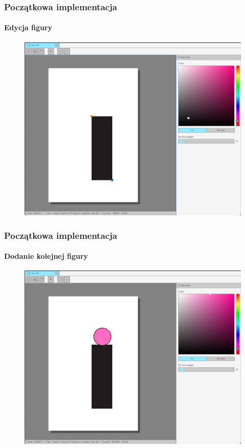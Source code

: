\documentclass[
	11pt,]{beamer}
\begin{document}
\begin{frame}
	\frametitle{Początkowa implementacja}
	\framesubtitle{Edycja figury}
	
	\begin{figure}
		\includegraphics[height=0.7\textheight]{figures/pro4.png}
	\end{figure}
\end{frame}

\begin{frame}
	\frametitle{Początkowa implementacja}
	\framesubtitle{Dodanie kolejnej figury}
	
	\begin{figure}
		\includegraphics[height=0.7\textheight]{figures/pro5.png}
	\end{figure}
\end{frame}
\end{document}

